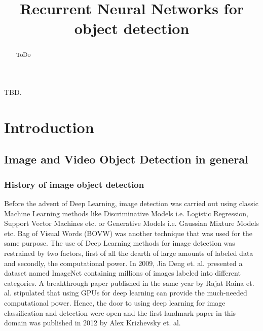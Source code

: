 \documentclass[conference]{IEEEtran}
\begin{document}
\title{Recurrent Neural Networks for object detection}

\author{
\and
{}
}

\maketitle

\begin{abstract}
ToDo
\end{abstract}

\begin{IEEEkeywords}
TBD.
\end{IEEEkeywords}

\section{Introduction}

\subsection{Image and Video Object Detection in general}
\subsubsection{History of image object detection} 
Before the advent of Deep Learning, image detection was carried out using classic Machine Learning methods like Discriminative Models i.e. Logistic Regression, Support Vector Machines etc. or Generative Models i.e. Gaussian Mixture Models etc. Bag of Visual Words (BOVW) was another technique that was used for the same purpose. The use of Deep Learning methods for image detection was restrained by two factors, first of all the dearth of large amounts of labeled data and secondly, the computational power. In 2009, Jia Deng et. al. presented a dataset named ImageNet\cite{b13} containing millions of images labeled into different categories. A breakthrough paper published in the same year by Rajat Raina\cite{b46} et. al. stipulated that using GPUs for deep learning can provide the much-needed computational power. Hence, the door to using deep learning for image classification and detection were open and the first landmark paper in this domain was published in 2012 by Alex Krizhevsky\cite{b14} et. al. \newline
\end{document}
